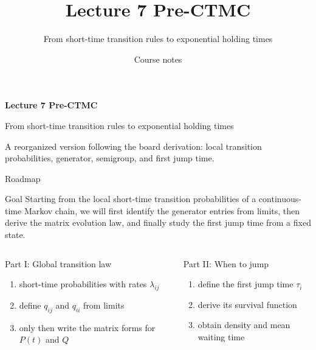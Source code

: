 \documentclass[aspectratio=169,professionalfonts]{beamer}
\title{Lecture 7 Pre-CTMC}
\subtitle{From short-time transition rules to exponential holding times}
\author{Course notes}
\date{}
\begin{document}
\begin{frame}[plain]
  \vspace{0.25cm}
  {\color{navy}\bfseries\LARGE Lecture 7 Pre-CTMC\par}
  \vspace{0.12cm}
  {\color{teal}\large From short-time transition rules to exponential holding times\par}
  \vspace{0.28cm}
  \centering
  \vspace{0.12cm}

  {\color{navy}\small A reorganized version following the board derivation: local transition probabilities, generator, semigroup, and first jump time.}
\end{frame}

\begin{frame}{Roadmap}
\small
\begin{block}{Goal}
Starting from the local short-time transition probabilities of a continuous-time Markov chain, we will first identify the generator entries from limits, then derive the matrix evolution law, and finally study the first jump time from a fixed state.
\end{block}

\begin{columns}[T,totalwidth=\textwidth]
\begin{alertblock}{Part I: Global transition law}
\begin{enumerate}
  \item short-time probabilities with rates $\lambda_{ij}$
  \item define $q_{ij}$ and $q_{ii}$ from limits
  \item only then write the matrix forms for $P(t)$ and $Q$
\end{enumerate}
\end{alertblock}

\begin{block}{Part II: When to jump}
\begin{enumerate}
  \item define the first jump time $\tau_i$
  \item derive its survival function
  \item obtain density and mean waiting time
\end{enumerate}
\end{block}
\end{columns}
\end{frame}
\end{document}
